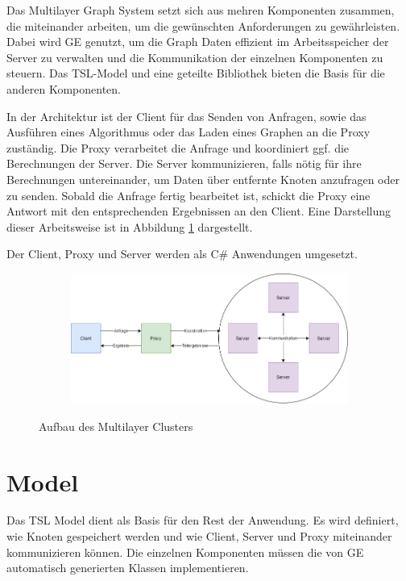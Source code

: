 Das Multilayer Graph System setzt sich aus mehren Komponenten zusammen, die miteinander arbeiten, um die gewünschten Anforderungen zu gewährleisten.
Dabei wird GE genutzt, um die Graph Daten effizient im Arbeitsspeicher der Server zu verwalten und die Kommunikation der einzelnen Komponenten zu steuern.  Das TSL-Model und eine geteilte Bibliothek bieten die Basis für die
anderen Komponenten.

In der Architektur ist der Client für das Senden von Anfragen, sowie das Ausführen eines Algorithmus oder das Laden eines Graphen an die Proxy zuständig.
Die Proxy verarbeitet die Anfrage und koordiniert ggf. die Berechnungen der Server. Die Server kommunizieren, falls nötig für ihre Berechnungen untereinander, um Daten über entfernte Knoten anzufragen oder zu senden. Sobald die Anfrage fertig bearbeitet ist, schickt die Proxy eine Antwort mit den entsprechenden Ergebnissen an den Client.
Eine Darstellung dieser Arbeitsweise ist in Abbildung \ref{architektur} dargestellt.

Der Client, Proxy und Server werden als C\# Anwendungen umgesetzt. 

\begin{figure}
  \centering
  \begin{subfigure}[b]{1.0\textwidth}
    \includegraphics[width=1.0\linewidth]{img/Architektur-Cluster.png}
  \end{subfigure}
  \caption{Aufbau des Multilayer Clusters}
  \label{architektur}
\end{figure}



\section{Model}

Das TSL Model dient als Basis für den Rest der Anwendung. Es wird definiert, wie Knoten gespeichert werden und wie Client, Server und Proxy miteinander
kommunizieren können. Die einzelnen Komponenten müssen die von GE automatisch generierten Klassen implementieren.


